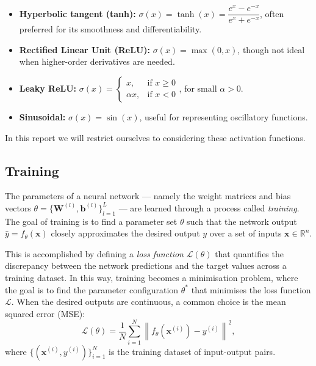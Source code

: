 \begin{itemize}
    \item \textbf{Hyperbolic tangent (tanh):} \quad 
    \( \sigma(x) = \tanh(x) = \dfrac{e^x - e^{-x}}{e^x + e^{-x}} \), 
    often preferred for its smoothness and differentiability.

    \item \textbf{Rectified Linear Unit (ReLU):} \quad 
    \( \sigma(x) = \max(0, x) \), 
    though not ideal when higher-order derivatives are needed.

    \item \textbf{Leaky ReLU:} \quad 
    \( \sigma(x) = 
    \begin{cases}
        x, & \text{if } x \geq 0 \\
        \alpha x, & \text{if } x < 0
    \end{cases} \), for small \( \alpha > 0 \).
    
    \item \textbf{Sinusoidal:} \quad 
    \( \sigma(x) = \sin(x) \), useful for representing oscillatory functions.
\end{itemize}

In this report we will restrict ourselves to considering these activation functions.


\subsection{Training}\label{sec:nn_training}

The parameters of a neural network — namely the weight matrices and bias vectors 
\( \theta = \{ \mathbf{W}^{(l)}, \mathbf{b}^{(l)} \}_{l=1}^L \) — are learned through a process 
called \emph{training}. The goal of training is to find a parameter set \( \theta \) such that the 
network output \( \hat{y} = f_\theta(\mathbf{x}) \) closely approximates the desired output \( y \) 
over a set of inputs \( \mathbf{x} \in \mathbb{R}^n \).

This is accomplished by defining a \emph{loss function} \( \mathcal{L}(\theta) \) that quantifies the 
discrepancy between the network predictions and the target values across a training dataset. 
In this way, training becomes a minimisation problem, where the goal is to find the parameter 
configuration $\theta^*$ that minimises the loss function $\mathcal{L}$.
When the desired outputs are continuous, a common choice is the mean squared error (MSE):
\[
    \mathcal{L}(\theta) = \frac{1}{N} \sum_{i=1}^{N} \left\| f_\theta(\mathbf{x}^{(i)}) - y^{(i)} \right\|^2,
\]
where \( \{ (\mathbf{x}^{(i)}, y^{(i)}) \}_{i=1}^N \) is the training dataset of input-output pairs.

